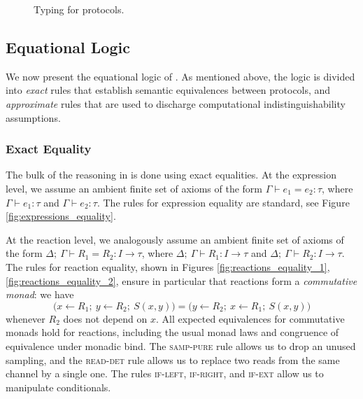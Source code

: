 \begin{figure*}[ht]
\caption{Typing for \ipdl protocols.}
\label{fig:protocols_typing}
\end{figure*}

\subsection{Equational Logic}
We now present the equational logic of \ipdl. As mentioned above, the logic is divided into \emph{exact} rules that establish semantic equivalences between protocols, and \emph{approximate} rules that are used to discharge computational indistinguishability assumptions. 

\subsubsection{Exact Equality}
The bulk of the reasoning in \ipdl is done using exact equalities. At the expression level, we assume an ambient finite set of axioms of the form $\Gamma \vdash e_1 = e_2 : \tau$, where $\Gamma \vdash e_1 : \tau$ and $\Gamma \vdash e_2 : \tau$. The rules for expression equality are standard, see Figure \ref{fig:expressions_equality}.

At the reaction level, we analogously assume an ambient finite set of axioms of the form $\Delta; \ \Gamma \vdash R_1 = R_2 : I \to \tau$, where $\Delta; \ \Gamma \vdash R_1 : I \to \tau$ and $\Delta; \ \Gamma \vdash R_2 : I \to \tau$. The rules for reaction equality, shown in Figures \ref{fig:reactions_equality_1}, \ref{fig:reactions_equality_2}, ensure in particular that reactions form a \emph{commutative monad}: we have \[\big(x \leftarrow R_1; \ y \leftarrow R_2; \ S(x,y)\big) = \big(y \leftarrow R_2; \ x \leftarrow R_1; \ S(x,y)\big)\] whenever $R_2$ does not depend on $x$. All expected equivalences for commutative monads hold for reactions, including the usual monad laws and congruence of equivalence under monadic bind. The \textsc{samp-pure} rule allows us to drop an unused sampling, and the \textsc{read-det} rule allows us to replace two reads from the same channel by a single one. The rules \textsc{if-left}, \textsc{if-right}, and \textsc{if-ext} allow us to manipulate conditionals.

